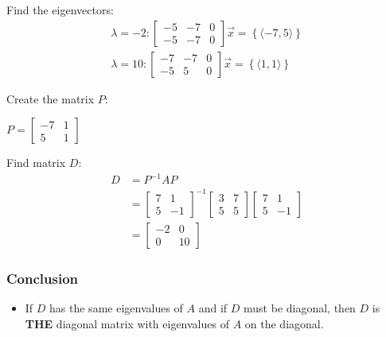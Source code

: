 \documentclass[
  letterpaper,
  DIV=11,
  numbers=noendperiod]{scrartcl}
\providecommand{\tightlist}{%
  \setlength{\itemsep}{0pt}\setlength{\parskip}{0pt}}\usepackage{longtable,booktabs,array}
\begin{document}
Find the eigenvectors: \begin{align*}
\lambda = -2: \left[\begin{array}{cc|c}-5 & -7 & 0 \\ -5 & -7 & 0\end{array}\right] 
\vec{x} = \left\{\langle-7, 5\rangle\right\} \\
\lambda = 10: \left[\begin{array}{cc|c}-7 & -7 & 0 \\ -5 & 5 & 0\end{array}\right]
\vec{x} = \left\{\langle1,     1\rangle\right\}
\end{align*}

\newpage{}

Create the matrix \(P\):

\(P = \begin{bmatrix}-7 & 1 \\ 5 & 1\end{bmatrix}\)

Find matrix \(D\): \begin{align*}
D &= P^{-1}AP \\
&= \begin{bmatrix}7 & 1 \\ 5 & -1\end{bmatrix}^{-1}\begin{bmatrix}3 & 7 \\ 5 & 5\end{bmatrix}\begin{bmatrix}7 & 1 \\ 5 & -1\end{bmatrix} \\
&= \begin{bmatrix}-2 & 0 \\ 0 & 10\end{bmatrix}
\end{align*}

\hypertarget{conclusion}{%
\subsubsection{Conclusion}\label{conclusion}}

\begin{itemize}
\tightlist
\item
  If \(D\) has the same eigenvalues of \(A\) and if \(D\) must be
  diagonal, then \(D\) is \textbf{THE} diagonal matrix with eigenvalues
  of \(A\) on the diagonal.
\end{itemize}
\end{document}
